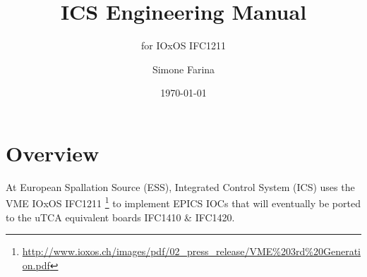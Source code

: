 \documentclass[11pt
  , a4paper
  , article
  , oneside
  , showtrims
]{memoir}
\begin{document}


\date{\today}




\title{ICS Engineering Manual}
\subtitle{for IOxOS IFC1211}
\author{Simone Farina }



\showtrimson

\esstitle
\newpage
\tableofcontents
\newpage



\chapter{Overview}
At European Spallation Source (ESS), Integrated Control System (ICS) uses the VME IOxOS IFC1211 {\footnote{\url{http://www.ioxos.ch/images/pdf/02_press_release/VME\%203rd\%20Generation.pdf}}} to implement EPICS IOCs that will eventually be ported to the uTCA equivalent boards IFC1410 \& IFC1420.
\end{document}

